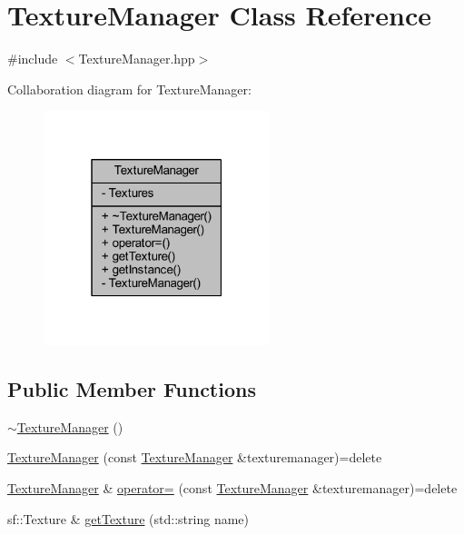 \hypertarget{class_texture_manager}{\section{Texture\-Manager Class Reference}
\label{class_texture_manager}
}


{\ttfamily \#include $<$Texture\-Manager.\-hpp$>$}



Collaboration diagram for Texture\-Manager\-:\nopagebreak
\begin{figure}[H]
\begin{center}
\leavevmode
\includegraphics[width=187pt]{class_texture_manager__coll__graph}
\end{center}
\end{figure}
\subsection*{Public Member Functions}
\begin{DoxyCompactItemize}
\item 
\hyperlink{class_texture_manager_a001d6d74674961db79987e3222682576}{$\sim$\-Texture\-Manager} ()
\item 
\hyperlink{class_texture_manager_a1dd1edddd0c9bf3cd24848a00f1f0cf6}{Texture\-Manager} (const \hyperlink{class_texture_manager}{Texture\-Manager} \&texturemanager)=delete
\item 
\hyperlink{class_texture_manager}{Texture\-Manager} \& \hyperlink{class_texture_manager_a87439b6ae73b59eb3729e8af1013a790}{operator=} (const \hyperlink{class_texture_manager}{Texture\-Manager} \&texturemanager)=delete
\item 
sf\-::\-Texture \& \hyperlink{class_texture_manager_af3bb59dfc343791c8c29e7b5c5458df2}{get\-Texture} (std\-::string name)
\end{DoxyCompactItemize}
